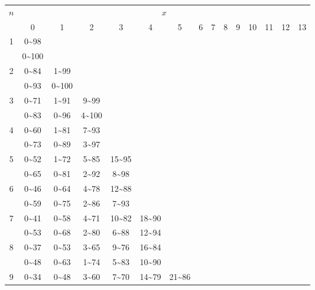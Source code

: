 \documentclass[lang=cn,10pt]{elegantbook}
\begin{document}
\scriptsize
\begin{longtable}{c|cccccccccccccc}
    \hline
    $n$ & \multicolumn{14}{c}{$x$} \\
    & 0 & 1 & 2 & 3 & 4 & 5 & 6 & 7 & 8 & 9 & 10 & 11 & 12 & 13 \\
    \hline
    \endhead
    1 & 0\textasciitilde98 & & & & & & & & & & & & & \\
      & 0\textasciitilde100 & & & & & & & & & & & & & \\
    2 & 0\textasciitilde84 & 1\textasciitilde99 & & & & & & & & & & & & \\
      & 0\textasciitilde93 & 0\textasciitilde100 & & & & & & & & & & & & \\
    3 & 0\textasciitilde71 & 1\textasciitilde91 & 9\textasciitilde99 & & & & & & & & & & & \\
      & 0\textasciitilde83 & 0\textasciitilde96 & 4\textasciitilde100 & & & & & & & & & & & \\
    4 & 0\textasciitilde60 & 1\textasciitilde81 & 7\textasciitilde93 & & & & & & & & & & & \\
      & 0\textasciitilde73 & 0\textasciitilde89 & 3\textasciitilde97 & & & & & & & & & & & \\
    5 & 0\textasciitilde52 & 1\textasciitilde72 & 5\textasciitilde85 & 15\textasciitilde95 & & & & & & & & & & \\
      & 0\textasciitilde65 & 0\textasciitilde81 & 2\textasciitilde92 & 8\textasciitilde98 & & & & & & & & & & \\
    6 & 0\textasciitilde46 & 0\textasciitilde64 & 4\textasciitilde78 & 12\textasciitilde88 & & & & & & & & & & \\
      & 0\textasciitilde59 & 0\textasciitilde75 & 2\textasciitilde86 & 7\textasciitilde93 & & & & & & & & & & \\
    7 & 0\textasciitilde41 & 0\textasciitilde58 & 4\textasciitilde71 & 10\textasciitilde82 & 18\textasciitilde90 & & & & & & & & & \\
      & 0\textasciitilde53 & 0\textasciitilde68 & 2\textasciitilde80 & 6\textasciitilde88 & 12\textasciitilde94 & & & & & & & & & \\
    8 & 0\textasciitilde37 & 0\textasciitilde53 & 3\textasciitilde65 & 9\textasciitilde76 & 16\textasciitilde84 & & & & & & & & & \\
      & 0\textasciitilde48 & 0\textasciitilde63 & 1\textasciitilde74 & 5\textasciitilde83 & 10\textasciitilde90 & & & & & & & & & \\
    9 & 0\textasciitilde34 & 0\textasciitilde48 & 3\textasciitilde60 & 7\textasciitilde70 & 14\textasciitilde79 & 21\textasciitilde86 & & & & & & & & \\

\end{longtable}
\end{document}
